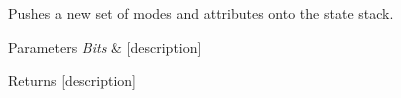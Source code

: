 Pushes a new set of modes and attributes onto the state stack. 


\begin{DoxyParams}{Parameters}
{\em Bits} & \mbox{[}description\mbox{]} \\
\hline
\end{DoxyParams}
\begin{DoxyReturn}{Returns}
\mbox{[}description\mbox{]} 
\end{DoxyReturn}
